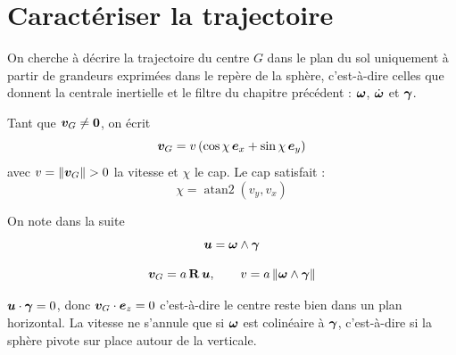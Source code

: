 
\section{Caractériser la trajectoire}

On cherche à décrire la trajectoire du centre $G$ dans le plan du sol
uniquement à partir de grandeurs exprimées dans le repère de la sphère,
c'est-à-dire celles que donnent la centrale inertielle et le filtre du
chapitre précédent : $\bm{\omega}$, $\dot{\bm{\omega}}$ et
$\bm{\gamma}$.

\begin{definition}
    Tant que $\bm{v}_G \neq \bm{0}$, on écrit
    \begin{equation}
        \bm{v}_G = v\,(\cos\chi\,\bm{e}_x + \sin\chi\,\bm{e}_y)
    \end{equation}
    avec $v = \|\bm{v}_G\| > 0$ la vitesse et $\chi$ le cap. Le cap satisfait :
    \begin{equation}
        \chi = \operatorname{atan2}(v_y, v_x)
    \end{equation}
\end{definition}

On note dans la suite
\begin{equation}
    \bm{u} = \bm{\omega}\wedge\bm{\gamma}
\end{equation}

\begin{proposition}[Vitesse]
    \begin{equation}
        \bm{v}_G = a\,\mathbf{R}\,\bm{u},
        \qquad
        v = a\,\|\bm{\omega}\wedge\bm{\gamma}\|
    \end{equation}
\end{proposition}

\begin{remarque}
    $\bm{u}\cdot\bm{\gamma} = 0$, donc $\bm{v}_G\cdot\bm{e}_z = 0$ c'est-à-dire
    le centre reste bien dans un plan horizontal. La vitesse ne s'annule que
    si $\bm{\omega}$ est colinéaire à $\bm{\gamma}$, c'est-à-dire si la
    sphère pivote sur place autour de la verticale.
\end{remarque}

